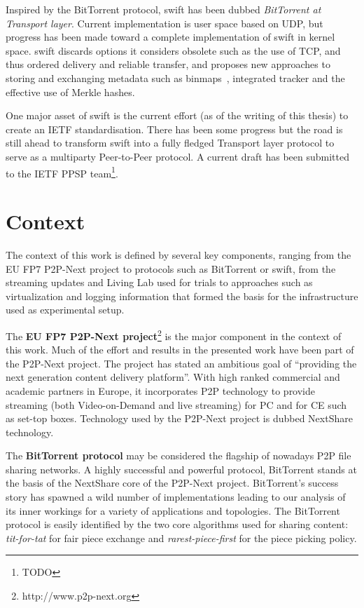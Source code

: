 Inspired by the BitTorrent protocol, swift has been dubbed \textit{BitTorrent
at Transport layer}. Current implementation is user space based on UDP, but
progress has been made toward a complete implementation of swift in kernel
space. swift discards options it considers obsolete such as the use of TCP,
and thus ordered delivery and reliable transfer, and proposes new approaches
to storing and exchanging metadata such as binmaps~\cite{binmaps}, integrated
tracker and the effective use of Merkle hashes.

One major asset of swift is the current effort (as of the writing of this
thesis) to create an IETF standardisation. There has been some progress but
the road is still ahead to transform swift into a fully fledged
Transport layer protocol to serve as a multiparty Peer-to-Peer protocol. A
current draft has been submitted to the IETF PPSP team\footnote{TODO}.

\section{Context}
\label{sec:intro:context}

The context of this work is defined by several key components, ranging from
the EU FP7 P2P-Next project to protocols such as BitTorrent or swift, from
the streaming updates and Living Lab used for trials to approaches such as
virtualization and logging information that formed the basis for the
infrastructure used as experimental setup.

The \textbf{EU FP7 P2P-Next project}\footnote{http://www.p2p-next.org} is the
major component in the context of this work. Much of the effort and results in
the presented work have been part of the P2P-Next project. The project has
stated an ambitious goal of ``providing the next generation content delivery
platform''. With high ranked commercial and academic partners in Europe, it
incorporates P2P technology to provide streaming (both Video-on-Demand and
live streaming) for PC and for CE such as set-top boxes. Technology used by
the P2P-Next project is dubbed NextShare technology.

The \textbf{BitTorrent protocol} may be considered the flagship of nowadays
P2P file sharing networks. A highly successful and powerful protocol,
BitTorrent stands at the basis of the NextShare core of the P2P-Next project.
BitTorrent's success story has spawned a wild number of implementations
leading to our analysis of its inner workings for a variety of applications and
topologies. The BitTorrent protocol is easily identified by the two core
algorithms used for sharing content: \textit{tit-for-tat} for fair piece
exchange and \textit{rarest-piece-first} for the piece picking policy.

